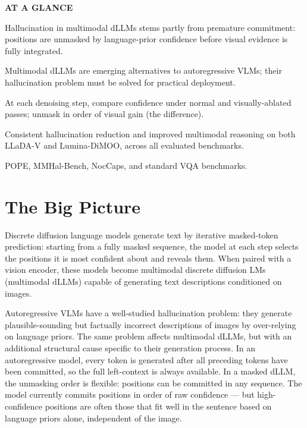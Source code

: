 \documentclass[10pt,twocolumn]{article}
\begin{document}
\begin{mdframed}[backgroundcolor=boxgray,linecolor=rulered,linewidth=1pt,
    innerleftmargin=6pt,innerrightmargin=6pt,
    innertopmargin=6pt,innerbottommargin=6pt]
\textbf{\small AT A GLANCE}\par\vspace{4pt}
\begin{description}[leftmargin=0pt,labelsep=4pt,itemsep=2pt,parsep=0pt,
    font=\small\bfseries]
  \item[Problem:] Hallucination in multimodal dLLMs stems partly from premature
    commitment: positions are unmasked by language-prior confidence before
    visual evidence is fully integrated.
  \item[Why it matters:] Multimodal dLLMs are emerging alternatives to
    autoregressive VLMs; their hallucination problem must be solved for
    practical deployment.
  \item[Method:] At each denoising step, compare confidence under normal and
    visually-ablated passes; unmask in order of visual gain (the difference).
  \item[Result:] Consistent hallucination reduction and improved multimodal
    reasoning on both LLaDA-V and Lumina-DiMOO, across all evaluated benchmarks.
  \item[Evidence:] POPE, MMHal-Bench, NocCaps, and standard VQA benchmarks.
\end{description}
\end{mdframed}

\section{The Big Picture}

Discrete diffusion language models generate text by iterative masked-token
prediction: starting from a fully masked sequence, the model at each step
selects the positions it is most confident about and reveals them. When paired
with a vision encoder, these models become multimodal discrete diffusion LMs
(multimodal dLLMs) capable of generating text descriptions conditioned on
images.

Autoregressive VLMs have a well-studied hallucination problem: they generate
plausible-sounding but factually incorrect descriptions of images by over-relying
on language priors. The same problem affects multimodal dLLMs, but with an
additional structural cause specific to their generation process. In an
autoregressive model, every token is generated after all preceding tokens have
been committed, so the full left-context is always available. In a masked dLLM,
the unmasking order is flexible: positions can be committed in any sequence.
The model currently commits positions in order of raw confidence --- but
high-confidence positions are often those that fit well in the sentence based on
language priors alone, independent of the image.
\end{document}
